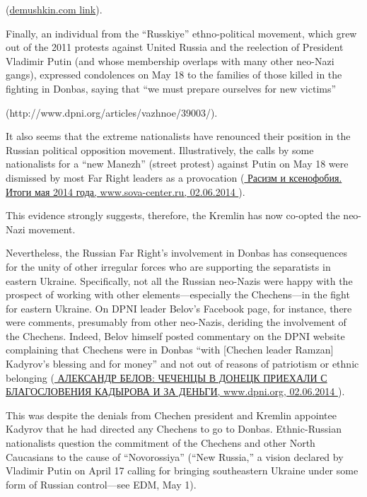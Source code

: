 \begin{itemize}
\begin{itemize}
\begin{multicols}{2}
(\href{http://www.demushkin.com/content/news/222/8964.html}{demushkin.com link}). 

Finally, an individual
from the \enquote{Russkiye} ethno-political movement, which grew out of the 2011
protests against United Russia and the reelection of President Vladimir Putin
(and whose membership overlaps with many other neo-Nazi gangs), expressed
condolences on May 18 to the families of those killed in the fighting in
Donbas, saying that \enquote{we must prepare ourselves for new victims}

(http://www.dpni.org/articles/vazhnoe/39003/).

It also seems that the extreme nationalists have renounced their position in
the Russian political opposition movement. Illustratively, the calls by some
nationalists for a \enquote{new Manezh} (street protest) against Putin on May 18 were
dismissed by most Far Right leaders as a provocation
(\href{http://www.sova-center.ru/racism-xenophobia/publications/2014/06/d29635/}{%
Расизм и ксенофобия. Итоги мая 2014 года, www.sova-center.ru, 02.06.2014%
}).

This evidence strongly suggests, therefore, the Kremlin has now co-opted the
neo-Nazi movement.

Nevertheless, the Russian Far Right’s involvement in Donbas has consequences
for the unity of other irregular forces who are supporting the separatists in
eastern Ukraine. Specifically, not all the Russian neo-Nazis were happy with
the prospect of working with other elements—especially the Chechens—in the
fight for eastern Ukraine. On DPNI leader Belov’s Facebook page, for instance,
there were comments, presumably from other neo-Nazis, deriding the involvement
of the Chechens. Indeed, Belov himself posted commentary on the DPNI website
complaining that Chechens were in Donbas \enquote{with [Chechen leader Ramzan]
Kadyrov’s blessing and for money} and not out of reasons of patriotism or
ethnic belonging (\href{http://www.dpni.org/articles/novostnaya/39200/}{%
АЛЕКСАНДР БЕЛОВ: ЧЕЧЕНЦЫ В ДОНЕЦК ПРИЕХАЛИ С БЛАГОСЛОВЕНИЯ КАДЫРОВА И ЗА ДЕНЬГИ, %
www.dpni.org, 02.06.2014%
}). 

This was despite the denials from Chechen president and Kremlin appointee
Kadyrov that he had directed any Chechens to go to Donbas. Ethnic-Russian
nationalists question the commitment of the Chechens and other North Caucasians
to the cause of \enquote{Novorossiya} (\enquote{New Russia,} a vision declared
by Vladimir Putin on April 17 calling for bringing southeastern Ukraine under
some form of Russian control—see EDM, May 1). 


\end{multicols}
\end{itemize}
\end{itemize}
